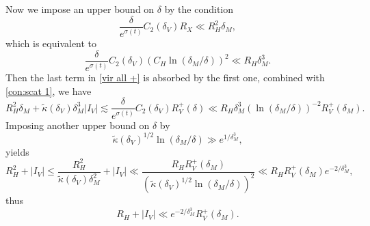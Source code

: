 \documentclass[reqno, 11pt]{amsart}
\numberwithin{equation}{section}
\theoremstyle{plain}
\theoremstyle{definition}
\numberwithin{equation}{section}
\numberwithin{theorem}{section}
\numberwithin{equation}{section}
\numberwithin{equation}{section}
\numberwithin{theorem}{section}
\begin{document}
	Now we impose an upper bound on $\delta$ by the condition
	\begin{equation*}
	\frac{\delta}{e^{\sigma(t)}} C_2(\delta_{V})R_{X} \ll R_{H}^{2}\delta_{M},
	\end{equation*}
	which is equivalent to 
	\begin{equation}\label{con:scat 1}
	\frac{\delta}{e^{\sigma(t)}}C_2(\delta_{V}) \left(C_H \ln\left( \delta_{M}/\delta \right)\right)^2 \ll R_{H}\delta_{M}^3.
	\end{equation}
	Then the last term in \eqref{vir all +} is absorbed by the first one, combined with \eqref{con:scat 1}, we have
	\begin{equation*}
	R_{H}^{2}\delta_{M}+\widetilde{\kappa}(\delta_{V})\delta_{M}^{3}|I_V|\lesssim	\frac{\delta}{e^{\sigma(t)}}C_2(\delta_{V}) R_{V}^{+}(\delta) \ll R_{H}\delta_{M}^3\left( \ln\left( \delta_{M}/\delta \right) \right)^{-2} R_{V}^{+}(\delta
	_M).
	\end{equation*}
	Imposing another upper bound on $\delta$ by 
	\begin{equation}\label{con:scat 2}
	\widetilde{\kappa}(\delta_{V})^{1/2}\ln \left( \delta_{M}/\delta \right) \gg e^{1/\delta_{M}^{3}} ,
	\end{equation}
	yields
	\begin{equation*}
	R_H^2 +|I_V|\leq \frac{R_H^2}{\widetilde{\kappa}(\delta_{V})\delta_{M}^2} +|I_V|\ll \frac{R_HR_{V}^{+}(\delta_M)}{\left( \widetilde{\kappa}(\delta_{V})^{1/2}\ln\left( \delta_{M}/\delta \right) \right)^2}\ll R_H R_{V}^{+}(\delta_M) e^{-2/\delta_{M}^{3}},
	\end{equation*}
	thus
	\begin{equation}\label{RV super}
	R_H +|I_V|\ll  e^{-2/\delta_{M}^{3}} R_{V}^{+}(\delta_M).
	\end{equation}
	
\end{document}
